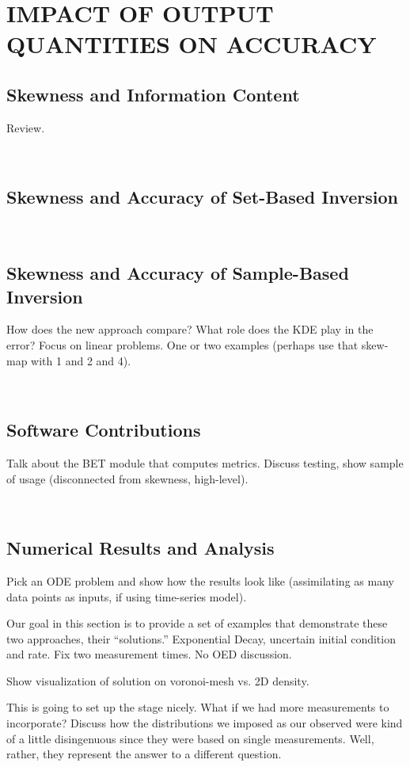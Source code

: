 \chapter{\uppercase{Impact of Output Quantities on Accuracy} \label{chapter:03}}

\section{Skewness and Information Content}
Review.

\
\section{Skewness and Accuracy of Set-Based Inversion}


\
\section{Skewness and Accuracy of Sample-Based Inversion}

How does the new approach compare? What role does the KDE play in the error?
Focus on linear problems. One or two examples (perhaps use that skew-map with 1 and 2 and 4).

\
\section{Software Contributions}

Talk about the BET module that computes metrics.
Discuss testing, show sample of usage (disconnected from skewness, high-level).

\
\section{Numerical Results and Analysis}

Pick an ODE problem and show how the results look like (assimilating as many data points as inputs, if using time-series model). 

Our goal in this section is to provide a set of examples that demonstrate these two approaches, their ``solutions.''
Exponential Decay, uncertain initial condition and rate. Fix two measurement times. No OED discussion.

Show visualization of solution on voronoi-mesh vs. 2D density. 

This is going to set up the stage nicely.
What if we had more measurements to incorporate? Discuss how the distributions we imposed as our observed were kind of a little disingenuous since they were based on single measurements. Well, rather, they represent the answer to a different question.

